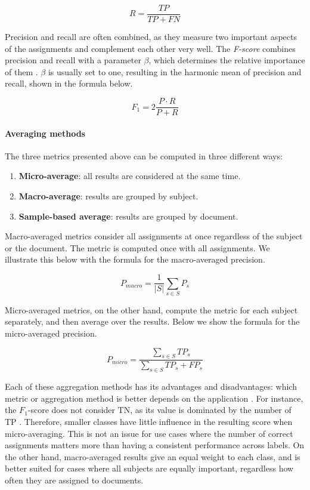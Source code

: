 $$ R = \frac{TP}{TP + FN} $$

Precision and recall are often combined, as they measure two important aspects of the assignments and complement each other very well. The \textit{F-score} combines precision and recall with a parameter $\beta$, which determines the relative importance of them \cite{medelyan2008domain}. $\beta$ is usually set to one, resulting in the harmonic mean of precision and recall, shown in the formula below.

$$ F_1 = 2 \frac{P \cdot R}{P + R} $$

\paragraph{Averaging methods} \mbox{}

The three metrics presented above can be computed in three different ways:

\begin{enumerate}
    \item \textbf{Micro-average}: all results are considered at the same time.
    \item \textbf{Macro-average}: results are grouped by subject.
    \item  \textbf{Sample-based average}: results are grouped by document.
\end{enumerate}

Macro-averaged metrics consider all assignments at once regardless of the subject or the document. The metric is computed once with all assignments. We illustrate this below with the formula for the macro-averaged precision.

$$ P_{macro} = \frac{1}{|S|} \sum_{s \in S} P_s  $$

Micro-averaged metrics, on the other hand, compute the metric for each subject separately, and then average over the results. Below we show the formula for the micro-averaged precision.

$$ P_{micro} = \frac{\sum_{s \in S} TP_s}{\sum_{s \in S} TP_s + FP_s}   $$

Each of these aggregation methods has its advantages and disadvantages: which metric or aggregation method is better depends on the application \cite{toepfer2020fusion}. For instance, the $F_1$-score does not consider TN, as its value is dominated by the number of TP \cite{gargiulo2019deep}. Therefore, smaller classes have little influence in the resulting score when micro-averaging. This is not an issue for use cases where the number of correct assignments matters more than having a consistent performance across labels. On the other hand, macro-averaged results give an equal weight to each class, and is better suited for cases where all subjects are equally important, regardless how often they are assigned to documents.

